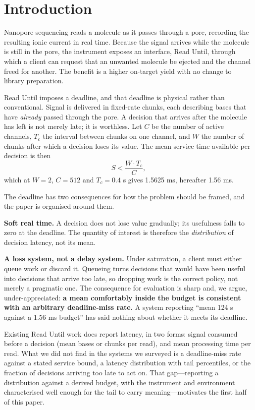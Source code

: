 \documentclass[runningheads]{llncs}
\begin{document}
\section{Introduction}
\label{sec:intro}

Nanopore sequencing reads a molecule as it passes through a pore, recording the resulting ionic
current in real time. Because the signal arrives while the molecule is still in the pore, the
instrument exposes an interface, Read Until, through which a client can request that an
unwanted molecule be ejected and the channel freed for another. The benefit is a higher
on-target yield with no change to library preparation.

Read Until imposes a deadline, and that deadline is physical rather than conventional. Signal
is delivered in fixed-rate chunks, each describing bases that have \emph{already} passed
through the pore. A decision that arrives after the molecule has left is not merely late; it is
worthless. Let $C$ be the number of active channels, $T_c$ the interval between chunks on one
channel, and $W$ the number of chunks after which a decision loses its value. The mean service
time available per decision is then
\begin{equation}
S < \frac{W \cdot T_c}{C},
\label{eq:budget}
\end{equation}
which at $W = 2$, $C = 512$ and $T_c = 0.4$ s gives 1.5625 ms, hereafter 1.56 ms.

The deadline has two consequences for how the problem should be framed, and the paper is
organised around them.

\textbf{Soft real time.} A decision does not lose value gradually; its usefulness falls to zero
at the deadline. The quantity of interest is therefore the \emph{distribution} of decision
latency, not its mean.

\textbf{A loss system, not a delay system.} Under saturation, a client must either queue work or
discard it. Queueing turns decisions that would have been useful into decisions that arrive too
late, so dropping work is the correct policy, not merely a pragmatic one. The
consequence for evaluation is sharp and, we argue, under-appreciated: \textbf{a mean
comfortably inside the budget is consistent with an arbitrary deadline-miss rate.} A system
reporting ``mean 124 \textmu{}s against a 1.56 ms budget'' has said nothing about whether it meets its
deadline.

Existing Read Until work does report latency, in two forms: signal consumed before a decision
(mean bases or chunks per read), and mean processing time per read. What we did not find in the
systems we surveyed is a deadline-miss rate against a stated service bound, a latency
distribution with tail percentiles, or the fraction of decisions arriving too late to act on.
That gap---reporting a distribution against a derived budget, with the instrument and
environment characterised well enough for the tail to carry meaning---motivates the first half
of this paper.
\end{document}
